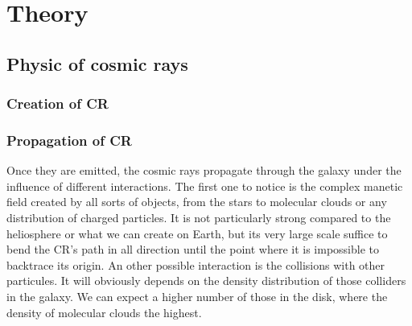 \chapter{Theory}
\label{ch:theory}
%
%


\section{Physic of cosmic rays}


\subsection{Creation of CR}


\subsection{Propagation of CR}

Once they are emitted, the cosmic rays propagate through the galaxy under the influence of different interactions.
The first one to notice is the complex manetic field created by all sorts of objects, from the stars to molecular clouds or any distribution of charged particles. It is not particularly strong  compared to the heliosphere or what we can create on Earth, but its very large scale suffice to bend the CR's path in all direction until the point where it is impossible to backtrace its origin.
An other possible interaction is the collisions with other particules. It will obviously depends on the density distribution of those colliders in the galaxy. We can expect a higher number of those in the disk, where the density of molecular clouds the highest.

